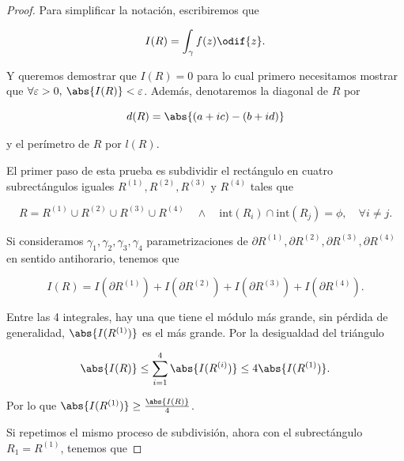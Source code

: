 \documentclass[../main.tex]{subfiles}
\begin{document}
\begin{proof}
    Para simplificar la notación, escribiremos que

    \begin{equation*}
        I(R) = \int_{\gamma}^{}f(z)\odif{z}.
    \end{equation*}

    Y queremos demostrar que \(I(R) = 0\) para lo cual primero necesitamos
    mostrar que \(\forall
    \varepsilon > 0,\medspace \abs{I(R)} < \varepsilon\). Además, denotaremos la
    diagonal de \(R\) por

    \begin{equation*}
        d(R) = \abs{(a + ic) - (b + id)}
    \end{equation*}

    y el perímetro de \(R\) por \(l(R)\).

    El primer paso de esta prueba es subdividir el rectángulo en cuatro subrectángulos
    iguales \(R^{(1)}, R^{(2)}, R^{(3)}\) y \(R^{(4)}\) tales que

    \begin{equation*}
        R = R^{(1)} \cup R^{(2)} \cup R^{(3)} \cup R^{(4)}\quad \wedge \quad
        \mathrm{int}(R_{i}) \cap \mathrm{int}(R_{j}) = \phi,\quad \forall i \neq j.
    \end{equation*}

    Si consideramos \(\gamma_{1}, \gamma_{2}, \gamma_{3}, \gamma_{4}\)
    parametrizaciones de
    \(\partial R^{(1)},\partial R^{(2)}, \partial R^{(3)}, \partial R^{(4)}\) en sentido
    antihorario, tenemos que

    \begin{equation*}
        I(R) = I(\partial R^{(1)}) + I(\partial R^{(2)}) +I(\partial R^{(3)})
        +I(\partial
        R^{(4)}).
    \end{equation*}

    Entre las 4 integrales, hay una que tiene el módulo más grande, sin pérdida de
    generalidad, \(\abs{I(R^{(1)})}\) es el más grande. Por la desigualdad del triángulo

    \begin{equation*}
        \abs{I(R)} \leq \sum_{i = 1}^{4} \abs{I(R^{(i)})} \leq 4 \abs{I(R^{(1)})}.
    \end{equation*}

    Por lo que \(\abs{I(R^{(1)})} \geq \tfrac{\abs{I(R)}}{4}\).

    Si repetimos el mismo proceso de subdivisión, ahora con el subrectángulo \(R_{1} =
    R^{(1)}\), tenemos que


\end{proof}
\end{document}
